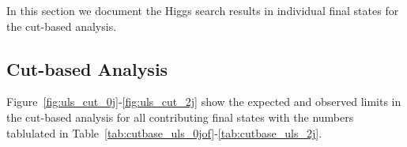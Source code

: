In this section we document the Higgs search results in individual final states for the cut-based analysis.  

\subsection{Cut-based Analysis}

Figure~\ref{fig:uls_cut_0j}-\ref{fig:uls_cut_2j} show the expected and observed limits in the cut-based analysis 
for all contributing final states with the numbers tablulated in Table~\ref{tab:cutbase_uls_0jof}-\ref{tab:cutbase_uls_2j}. 

\begin{figure}[!hbtp]
\centering
{}
\centering
{} \\

\end{figure}
